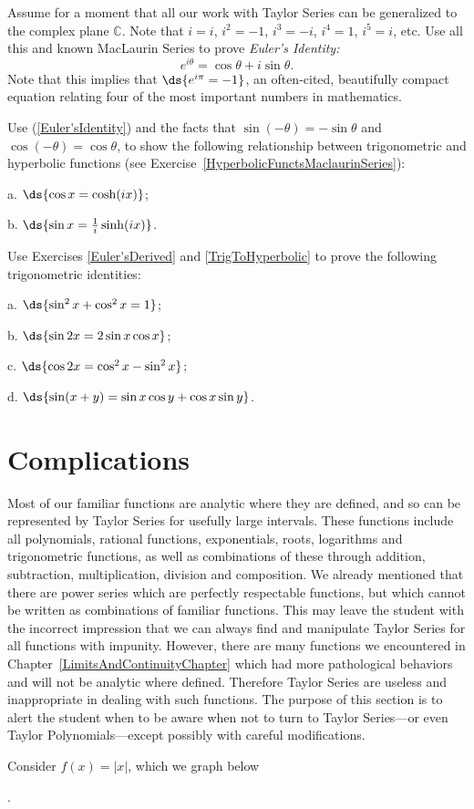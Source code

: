 \bhw Assume for a moment that all our work with Taylor Series
can be generalized to the complex plane $\mathbb{C}$.
Note that $i=i$, $i^2=-1$, $i^3=-i$, $i^4=1$, $i^5=i$, etc.
Use all this and known MacLaurin Series to prove {\it Euler's Identity:}
\begin{equation}e^{i\theta}=\cos\theta+i\sin\theta.
\label{Euler'sIdentity}\end{equation}
\label{Euler'sDerived}
Note that this implies that  $\ds{e^{i\pi}=-1}$, an often-cited,
beautifully compact equation relating four of the most important
numbers in mathematics. 
 \ehw 

\bhw Use (\ref{Euler'sIdentity}) and the facts
that $\sin(-\theta)=-\sin\theta$ and  $\cos(-\theta)=\cos\theta$, 
to show the following relationship between trigonometric and 
hyperbolic functions (see Exercise~\ref{HyperbolicFunctsMaclaurinSeries}):
\begin{description}
\item a. $\ds{\cos x=\cosh(ix)}$; 
\item b. $\ds{\sin x=\frac1i\sinh(ix)}$.
\end{description}\label{TrigToHyperbolic}\ehw
\bhw Use Exercises \ref{Euler'sDerived} and \ref{TrigToHyperbolic}
to prove the following trigonometric identities: 
\begin{description}
\item a. $\ds{\sin^2x+\cos^2x=1}$;
\item b. $\ds{\sin2x=2\sin x\cos x}$;
\item c. $\ds{\cos2x=\cos^2x-\sin^2x}$;
\item d. $\ds{\sin(x+y)=\sin x\cos y+\cos x\sin y}$.
\end{description}
\ehw
\newpage

\section{Complications}
Most of our familiar functions are analytic where they are defined, and
so can be represented by Taylor Series for usefully large intervals.  These 
functions include all polynomials, rational functions, 
exponentials, roots, logarithms and trigonometric functions, as well as
combinations of these through addition, subtraction, multiplication,
division and composition.  We already mentioned that there are
power series which are perfectly respectable functions, but which
cannot be written as combinations of familiar functions.
This may leave the student with the incorrect
impression that we can always find and manipulate Taylor Series 
for all functions with 
impunity.  However, there are many functions we encountered in 
Chapter~\ref{LimitsAndContinuityChapter} which had
more pathological behaviors and will not be analytic
where defined. Therefore Taylor Series are useless and
inappropriate in dealing with such functions.
The purpose of this section is to alert
the student when to be aware when not to turn to Taylor Series---or even 
Taylor Polynomials---except possibly with careful modifications.
\begin{example}Consider $f(x)=|x|$, which we graph below

\end{example}. 

